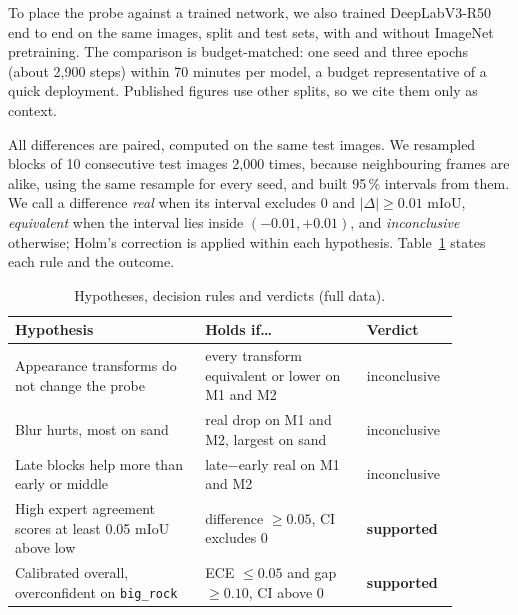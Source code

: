 \documentclass[conference]{IEEEtran}
\newcommand{\bigrock}{\texttt{big\_rock}}
\begin{document}
To place the probe against a trained network, we also trained DeepLabV3-R50 end to end on the same images, split and test sets, with and without ImageNet pretraining. The comparison is budget-matched: one seed and three epochs (about 2{,}900 steps) within 70 minutes per model, a budget representative of a quick deployment. Published figures use other splits, so we cite them only as context.

All differences are paired, computed on the same test images. We resampled blocks of 10 consecutive test images 2{,}000 times, because neighbouring frames are alike, using the same resample for every seed, and built 95\,\% intervals from them. We call a difference \emph{real} when its interval excludes 0 and $|\Delta|\ge 0.01$ mIoU, \emph{equivalent} when the interval lies inside $(-0.01,+0.01)$, and \emph{inconclusive} otherwise; Holm's correction is applied within each hypothesis. Table~\ref{tab:hyp} states each rule and the outcome.

\begin{table}[t]\centering\footnotesize
\caption{Hypotheses, decision rules and verdicts (full data).}\label{tab:hyp}
\begin{tabular}{@{}p{0.40\linewidth}p{0.34\linewidth}p{0.14\linewidth}@{}}\toprule
Hypothesis & Holds if\ldots & Verdict\\\midrule
Appearance transforms do not change the probe & every transform equivalent or lower on M1 and M2 & inconclusive\\
Blur hurts, most on sand & real drop on M1 and M2, largest on sand & inconclusive\\
Late blocks help more than early or middle & late$-$early real on M1 and M2 & inconclusive\\
High expert agreement scores at least 0.05 mIoU above low & difference $\ge0.05$, CI excludes 0 & \textbf{supported}\\
Calibrated overall, overconfident on \bigrock & ECE $\le0.05$ and gap $\ge0.10$, CI above 0 & \textbf{supported}\\\bottomrule
\end{tabular}\end{table}
\end{document}
